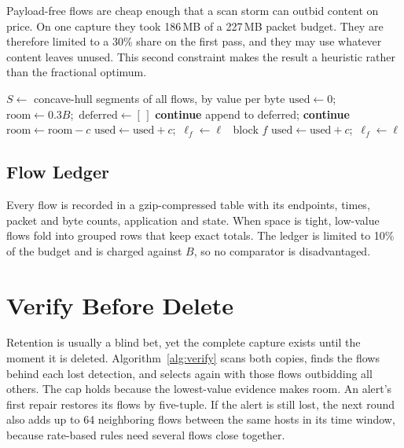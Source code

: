\documentclass[conference]{IEEEtran}
\begin{document}
Payload-free flows are cheap enough that a scan storm can outbid content on price. On one capture they took 186\,MB of a 227\,MB packet budget. They are therefore limited to a 30\% share on the first pass, and they may use whatever content leaves unused. This second constraint makes the result a heuristic rather than the fractional optimum.

\begin{algorithm}[t]
\caption{Budgeted Level Selection}
\label{alg:alloc}
\footnotesize
\begin{algorithmic}[1]
\State $S\gets$ concave-hull segments of all flows, by value per byte
\State $\text{used}\gets 0$;\ $\text{room}\gets 0.3B$;\ $\text{deferred}\gets[\,]$
   \textbf{continue} \EndIf
     append to deferred; \textbf{continue} \EndIf
    \State $\text{room}\gets\text{room}-c$
  \EndIf
   $\text{used}\gets\text{used}+c$;\ $\ell_f\gets\ell$
  \Else\ block $f$ \EndIf
\EndFor
{}
  \State $\text{used}\gets\text{used}+c$;\ $\ell_f\gets\ell$
\EndFor
\end{algorithmic}
\end{algorithm}

\subsection{Flow Ledger}
Every flow is recorded in a gzip-compressed table with its endpoints, times, packet and byte counts, application and state. When space is tight, low-value flows fold into grouped rows that keep exact totals. The ledger is limited to 10\% of the budget and is charged against $B$, so no comparator is disadvantaged.

\section{Verify Before Delete}
Retention is usually a blind bet, yet the complete capture exists until the moment it is deleted. Algorithm~\ref{alg:verify} scans both copies, finds the flows behind each lost detection, and selects again with those flows outbidding all others. The cap holds because the lowest-value evidence makes room. An alert's first repair restores its flows by five-tuple. If the alert is still lost, the next round also adds up to 64 neighboring flows between the same hosts in its time window, because rate-based rules need several flows close together.
\end{document}

